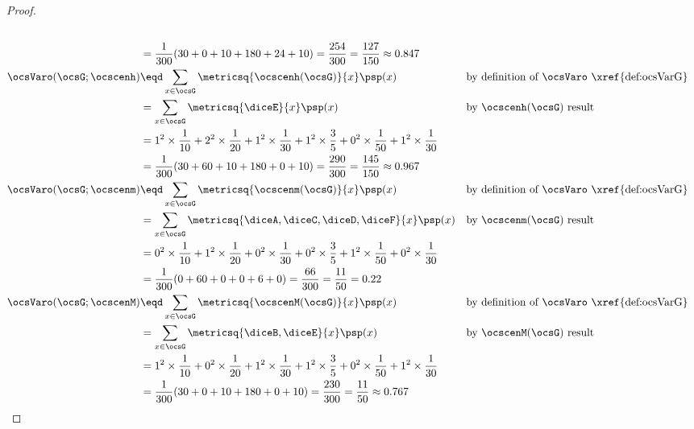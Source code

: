 \begin{tabstr}{0.75}
\begin{proof}
\begin{align*}
  \\&= \frac{1}{300}(30+0+10 + 180+24+10)
     = \frac{254}{300}
     = \frac{127}{150}
     \approx 0.847
  \\
  \ocsVaro(\ocsG;\ocscenh)
    &\eqd \sum_{x\in\ocsG}\metricsq{\ocscenh(\ocsG)}{x} \psp(x)
    &&\text{by definition of $\ocsVaro$ \xref{def:ocsVarG}}
  \\&= \sum_{x\in\ocsG}\metricsq{\diceE}{x} \psp(x)
    &&\text{by $\ocscenh(\ocsG)$ result}
  \\&= 1^2\times\frac{1}{10} + 2^2\times\frac{1}{20} + 1^2\times\frac{1}{30} + 
       1^2\times\frac{3}{5}  + 0^2\times\frac{1}{50} + 1^2\times\frac{1}{30}  
  \\&= \frac{1}{300}(30+60+10 + 180+0+10)
     = \frac{290}{300}
     = \frac{145}{150}
     \approx 0.967
  \\
  \ocsVaro(\ocsG;\ocscenm)
    &\eqd \sum_{x\in\ocsG}\metricsq{\ocscenm(\ocsG)}{x} \psp(x)
    &&\text{by definition of $\ocsVaro$ \xref{def:ocsVarG}}
  \\&= \sum_{x\in\ocsG}\metricsq{\diceA,\diceC,\diceD,\diceF}{x} \psp(x)
    &&\text{by $\ocscenm(\ocsG)$ result}
  \\&= 0^2\times\frac{1}{10} + 1^2\times\frac{1}{20} + 0^2\times\frac{1}{30} + 
       0^2\times\frac{3}{5}  + 1^2\times\frac{1}{50} + 0^2\times\frac{1}{30}  
  \\&= \frac{1}{300}( 0+60+ 0 +   0+6+ 0)
     = \frac{ 66}{300}
     = \frac{ 11}{ 50}
     =       0.22 
  \\
  \ocsVaro(\ocsG;\ocscenM)
    &\eqd \sum_{x\in\ocsG}\metricsq{\ocscenM(\ocsG)}{x} \psp(x)
    &&\text{by definition of $\ocsVaro$ \xref{def:ocsVarG}}
  \\&= \sum_{x\in\ocsG}\metricsq{\diceB,\diceE}{x} \psp(x)
    &&\text{by $\ocscenM(\ocsG)$ result}
  \\&= 1^2\times\frac{1}{10} + 0^2\times\frac{1}{20} + 1^2\times\frac{1}{30} + 
       1^2\times\frac{3}{5}  + 0^2\times\frac{1}{50} + 1^2\times\frac{1}{30}  
  \\&= \frac{1}{300}(30+ 0+10 + 180+0+10)
     = \frac{230}{300}
     = \frac{ 11}{ 50}
     \approx 0.767
\end{align*}
\end{proof}



\end{tabstr}
